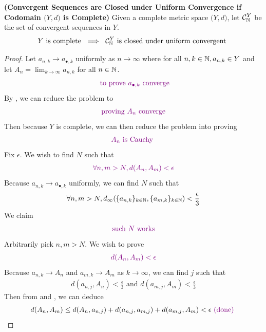 \documentclass{report}
\begin{document}
\begin{theorem}
\label{CSaC}
\textbf{(Convergent Sequences are Closed under Uniform Convergence if Codomain $\big(Y,d\big)$ is Complete)} Given a complete metric space $\big(Y,d\big)$, let $\mathcal{C}_{\mathbb{N}}^Y$ be the set of convergent sequences in $Y$.
\begin{align*}
Y\text{ is complete }\implies \text{ $\mathcal{C}_{\mathbb{N}}^Y$ is closed under uniform convergent }
\end{align*}
\end{theorem}
\begin{proof}
Let $a_{n,k}\to a_{\bullet,k}$ uniformly as $n\to \infty$ where for all $n,k \in\mathbb{N}, a_{n,k}\in Y$ and let $A_n= \lim_{k\to \infty}a_{n,k}$ for all $n\in\mathbb{N}$.  
\begin{align*}
  \textcolor{violet}{\text{ to prove $a_{\bullet,k}$ converge}}
\end{align*}
By , we can reduce the problem to 
\begin{align*}
\textcolor{violet}{\text{ proving $A_n$ converge }}
\end{align*}
Then because $Y$ is complete, we can then reduce the problem into proving 
\begin{align*}
  \textcolor{violet}{A_n\text{ is Cauchy }}
\end{align*}
Fix $\epsilon $. We wish to find $N$ such that 
 \begin{align*}
   \textcolor{violet}{\forall n,m>N, d(A_n,A_m)<\epsilon }
\end{align*}
Because $a_{n,k}\to a_{\bullet,k}$ uniformly, we can find $N$ such that  
 \begin{align}
\label{K10}
\forall n,m> N, d_\infty(\{ a_{n,k} \}_{k\in\mathbb{N}},\{ a_{m,k} \}_{k\in\mathbb{N}})<\frac{\epsilon}{3} 
\end{align}
We claim 
\begin{align*}
\textcolor{violet}{\text{ such $N$ works }}
\end{align*}
Arbitrarily pick $n,m>N$. We wish to prove 
\begin{align*}
\textcolor{violet}{d(A_n,A_m)<\epsilon }
\end{align*}
Because $a_{n,k} \to A_n$ and $a_{m,k}\to A_m$ as $k \to \infty$, we can find $j$ such that  
\begin{align}
\label{K11}
d(a_{n,j},A_n)<\frac{\epsilon}{3}\text{ and }d(a_{m,j},A_m)<\frac{\epsilon}{3}
\end{align}
Then from   and , we can deduce
\begin{align*}
d(A_n,A_m)\leq d(A_n,a_{n,j})+d(a_{n,j},a_{m,j})+d(a_{m,j},A_m)<\epsilon \textcolor{violet}{\text{ (done) }}
\end{align*}
\end{proof}
\end{document}
